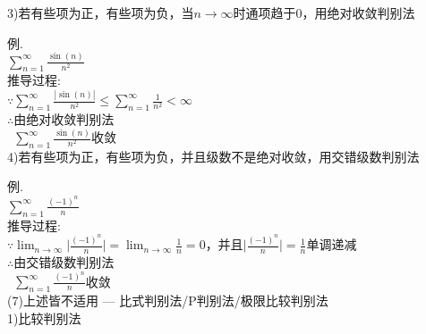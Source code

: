 3)若有些项为正，有些项为负，当$n\to\infty$时通项趋于0，用绝对收敛判别法\\
\begin{center}
\end{center}
例.\\
$\displaystyle\sum_{n=1}^{\infty}\frac{\sin(n)}{n^2}$\\[1ex]
推导过程:\\
$\because\displaystyle\sum_{n=1}^{\infty}\frac{|\sin(n)|}{n^2}\leqslant\sum_{n=1}^{\infty}\frac{1}{n^2}<\infty$\\
$\therefore$由绝对收敛判别法\\
$\phantom{\therefore}\displaystyle\sum_{n=1}^{\infty}\frac{\sin(n)}{n^2}$收敛\\[2ex]

4)若有些项为正，有些项为负，并且级数不是绝对收敛，用交错级数判别法\\
\begin{center}
\end{center}
例.\\
$\displaystyle\sum_{n=1}^{\infty}\frac{(-1)^n}{n}$\\[1ex]
推导过程:\\
$\because\displaystyle\lim_{n\to\infty}\Big|\frac{(-1)^n}{n}\Big|=\lim_{n\to\infty}\frac{1}{n}=0$，并且$\displaystyle\Big|\frac{(-1)^n}{n}\Big|=\frac{1}{n}$单调递减\\
$\therefore$由交错级数判别法\\
$\phantom{\therefore}\displaystyle\sum_{n=1}^{\infty}\frac{(-1)^n}{n}$收敛\\[2ex]

(7)上述皆不适用 --- 比式判别法/P判别法/极限比较判别法\\
1)比较判别法\\

